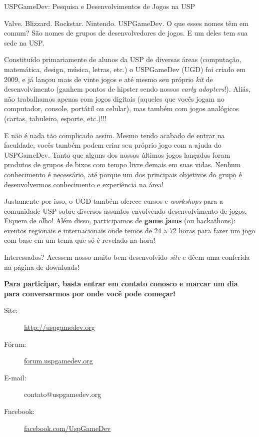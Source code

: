 \begin{subsecao}{USPGameDev: Pesquisa e Desenvolvimentos de Jogos na USP}


Valve. Blizzard. Rockstar. Nintendo. USPGameDev. O que esses nomes têm em comum?
São nomes de grupos de desenvolvedores de jogos. E um deles tem sua sede na USP.

Constituído primariamente de alunos da USP de diversas áreas (computação,
matemática, design, música, letras, etc.) o USPGameDev (UGD) foi criado em 2009,
e já lançou mais de vinte jogos e até mesmo seu próprio \textit{kit} de
desenvolvimento (ganhem pontos de hipster sendo nossos
\textit{early adopters}!). Aliás, não trabalhamos apenas com jogos digitais
(aqueles que vocês jogam no computador, console, portátil ou celular), mas
também com jogos analógicos (cartas, tabuleiro, esporte, etc.)!!!

E não é nada tão complicado assim. Mesmo tendo acabado de entrar na faculdade,
vocês também podem criar seu próprio jogo com a ajuda do USPGameDev. Tanto que
alguns dos nossos últimos jogos lançados foram produtos de grupos de bixos com
tempo livre demais em suas vidas. Nenhum conhecimento é necessário, até porque
um dos principais objetivos do grupo é desenvolvermos conhecimento e experiência
na área!

Justamente por isso, o UGD também oferece cursos e \textit{workshops} para a
comunidade USP sobre diversos assuntos envolvendo desenvolvimento de jogos.
Fiquem de olho! Além disso, participamos de \textbf{game jams} (ou hackathons):
eventos regionais e internacionais onde temos de 24 a 72 horas para fazer um
jogo com base em um tema que só é revelado na hora!

Interessados? Acessem nosso muito bem desenvolvido \textit{site} e dêem uma
conferida na página de downloads!

\textbf{Para participar, basta entrar em contato conosco e marcar um dia para
conversarmos por onde você pode começar!}

\begin{description}
  \item[Site:] \url{http://uspgamedev.org}
  \item[Fórum:] \url{forum.uspgamedev.org}
  \item[E-mail:] contato@uspgamedev.org
  \item[Facebook:] \url{facebook.com/UspGameDev}
\end{description}

\end{subsecao}
